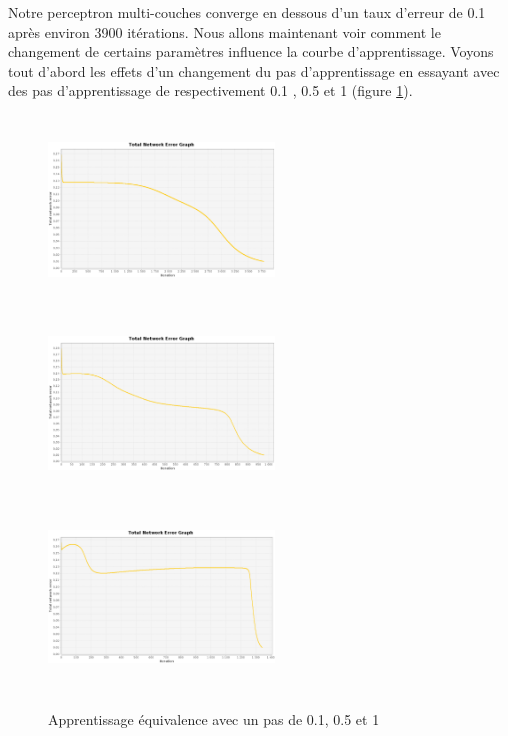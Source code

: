 \documentclass[twoside,openright,a4paper,11pt,french]{article}
\begin{document}
Notre perceptron multi-couches converge en dessous d'un taux d'erreur de 0.1
après environ 3900 itérations.
Nous allons maintenant voir comment le changement de certains paramètres
influence la courbe d'apprentissage. Voyons tout d'abord les effets d'un
changement du pas d'apprentissage en essayant avec des pas d'apprentissage de
respectivement 0.1 , 0.5 et 1 (figure \ref{fig:eqmult01051}).


\begin{figure}[ht]
\centering
\includegraphics[width=6cm,height=5cm]{./pics/eq/multi_eq_0.1.eps}
\includegraphics[width=6cm,height=5cm]{./pics/eq/multi_eq_0.5.eps}
\includegraphics[width=6cm,height=5cm]{./pics/eq/multi_eq_1.eps}
\caption{Apprentissage équivalence avec un pas de 0.1, 0.5 et 1}
\label{fig:eqmult01051}
\end{figure}
\end{document}

